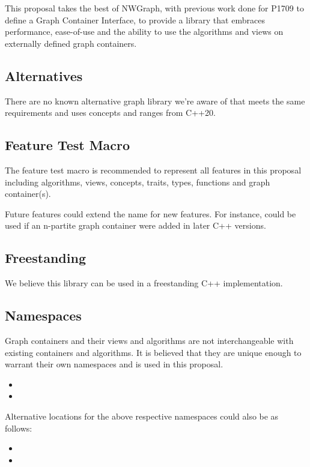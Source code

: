 This proposal takes the best of NWGraph, with previous work done for P1709 to define a Graph Container Interface, to provide a library that
embraces performance, ease-of-use and the ability to use the algorithms and views on externally defined graph containers.

\subsection{Alternatives}
There are no known alternative graph library we're aware of that meets the same requirements and uses concepts and ranges from C++20.


\subsection{Feature Test Macro}
The  feature test macro is recommended to represent all features in this proposal including algorithms, views, concepts, traits, types, functions and graph container(s).

Future features could extend the name for new features. For instance,  could be used if an n-partite graph container were added in later C++ versions.

\subsection{Freestanding}
We believe this library can be used in a freestanding C++ implementation.

\subsection{Namespaces}
Graph containers and their views and algorithms are not interchangeable with existing containers and algorithms.
It is believed that they are unique enough to warrant their own namespaces and is used in this proposal.
\begin{itemize}
\item[]
\item[]
\end{itemize}

\noindent
Alternative locations for the above respective namespaces could also be as follows:
\begin{itemize}
\item[]
\item[]
\end{itemize}
